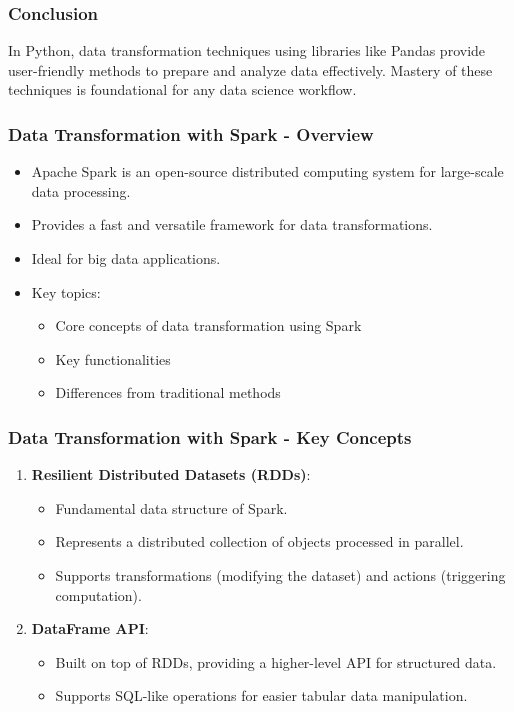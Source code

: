 \documentclass[aspectratio=169]{beamer}
\begin{document}
\begin{frame}
    \frametitle{Conclusion}
    In Python, data transformation techniques using libraries like Pandas provide user-friendly methods to prepare and analyze data effectively. Mastery of these techniques is foundational for any data science workflow.
\end{frame}

\begin{frame}[fragile]
    \frametitle{Data Transformation with Spark - Overview}
    \begin{itemize}
        \item Apache Spark is an open-source distributed computing system for large-scale data processing.
        \item Provides a fast and versatile framework for data transformations.
        \item Ideal for big data applications.
        \item Key topics:
        \begin{itemize}
            \item Core concepts of data transformation using Spark
            \item Key functionalities
            \item Differences from traditional methods
        \end{itemize}
    \end{itemize}
\end{frame}

\begin{frame}[fragile]
    \frametitle{Data Transformation with Spark - Key Concepts}
    \begin{enumerate}
        \item \textbf{Resilient Distributed Datasets (RDDs)}:
            \begin{itemize}
                \item Fundamental data structure of Spark.
                \item Represents a distributed collection of objects processed in parallel.
                \item Supports transformations (modifying the dataset) and actions (triggering computation).
            \end{itemize}
        \item \textbf{DataFrame API}:
            \begin{itemize}
                \item Built on top of RDDs, providing a higher-level API for structured data.
                \item Supports SQL-like operations for easier tabular data manipulation.
            \end{itemize}
    \end{enumerate}
\end{frame}
\end{document}
